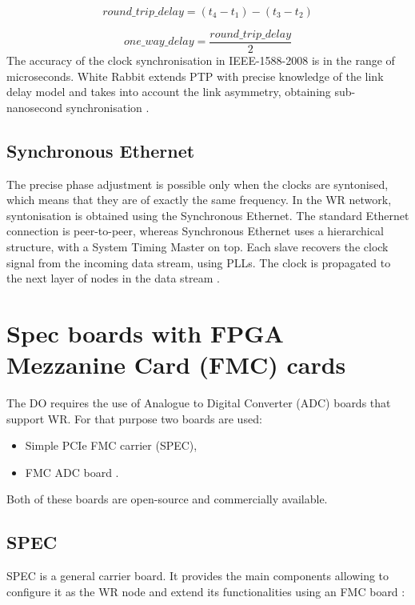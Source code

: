        \begin{equation}\label{eq:round_trip_delay}
        round\_trip\_delay = (t_4 - t_1) - (t_3 - t_2)
        \end{equation}
        
        \begin{equation}\label{eq:one_way_delay}
        one\_way\_delay = \frac{round\_trip\_delay}{2}
        \end{equation}
        The accuracy of the clock synchronisation in IEEE-1588-2008 is in the range of microseconds. White Rabbit extends PTP with precise knowledge of the link delay model and takes into account the link asymmetry, obtaining sub-nanosecond synchronisation \cite{wr_spec}.
        
    \subsection{Synchronous Ethernet}
        The precise phase adjustment is possible only when the clocks are syntonised, which means that they are of exactly the same frequency. In the WR network, syntonisation is obtained using the Synchronous Ethernet. 
        The standard Ethernet connection is peer-to-peer, whereas Synchronous Ethernet uses a hierarchical structure, with a System Timing Master on top. Each slave recovers the clock signal from the incoming data stream, using PLLs. The clock is propagated to the next layer of nodes in the data stream \cite{wr_master}.

\section{Spec boards with FPGA Mezzanine Card (FMC) cards}
    The DO requires the use of Analogue to Digital Converter (ADC) boards that support WR. For that purpose two boards are used:
    \begin{itemize}
        \item Simple PCIe FMC carrier (SPEC),
        \item FMC ADC board .
    \end{itemize}
    Both of these boards are open-source and commercially available.
    
    \subsection{SPEC}
        SPEC is a general carrier board. It provides the main components allowing to configure it as the WR node and extend its functionalities using an FMC board \cite{spec_ohwr}:
        
